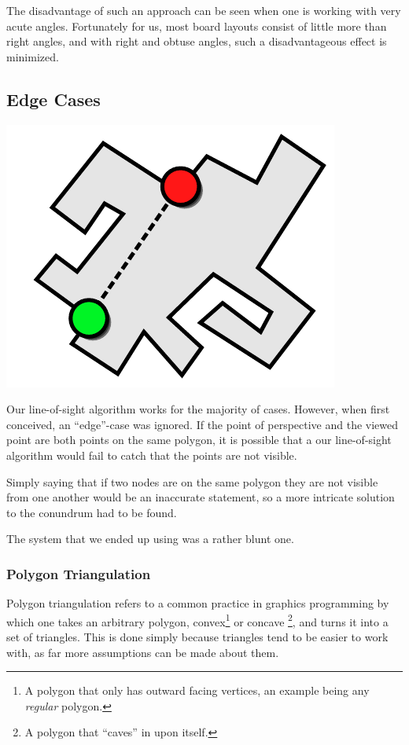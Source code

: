 \documentclass[letterpaper, 12pt]{article}
\begin{document}
\begin{multicols}{2}
The disadvantage of such an approach can be seen when one is working with very
acute angles. Fortunately for us, most board layouts consist of little more than
right angles, and with right and obtuse angles, such a disadvantageous effect is
minimized.

\subsection{Edge Cases}

\includegraphics[width=\columnwidth]{img/line_of_sight_flaw.pdf}

Our line-of-sight algorithm works for the majority of cases. However, when first
conceived, an ``edge''-case was ignored. If the point of perspective and the
viewed point are both points on the same polygon, it is possible that a our
line-of-sight algorithm would fail to catch that the points are not visible.

Simply saying that if two nodes are on the same polygon they are not visible
from one another would be an inaccurate statement, so a more intricate solution
to the conundrum had to be found.

The system that we ended up using was a rather blunt one.

\subsubsection{Polygon Triangulation}

Polygon triangulation refers to a common practice in graphics programming by
which one takes an arbitrary polygon, convex\footnote{A polygon that only has
outward facing vertices, an example being any \textit{regular} polygon.} or
concave \footnote{A polygon that ``caves'' in upon itself.}, and turns it into a
set of triangles. This is done simply because triangles tend to be easier to
work with, as far more assumptions can be made about them.


\end{multicols}
\end{document}
